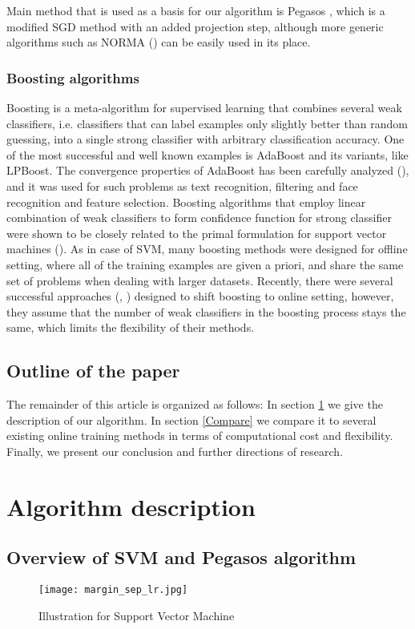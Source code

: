 \documentclass[10pt,twocolumn, a4paper]{article}
\begin{document}
Main method that is used as a basis for our algorithm is Pegasos \cite{Pegasos}, which is a modified SGD method with an added projection step, although more generic algorithms such as NORMA (\cite{Norma}) can be easily used in its place.

\subsubsection{Boosting algorithms}
Boosting is a meta-algorithm for supervised learning that combines several weak classifiers, i.e. classifiers that can label examples only slightly better than random guessing, into a single strong classifier with arbitrary classification accuracy. One of the most successful and well known examples is AdaBoost \cite{AdaBoost} and its variants, like LPBoost. The convergence properties of AdaBoost has been carefully analyzed (\cite{AdaAn}), and it was used for such problems as text recognition, filtering and face recognition and feature selection.  Boosting algorithms that employ linear combination of weak classifiers to form confidence function for strong classifier were shown to be closely related to the primal formulation for support vector machines (\cite{Boostsvm}). As in case of SVM, many boosting methods were designed for offline setting, where all of the training examples are given a priori, and share the same set of problems when dealing with larger datasets. Recently, there were several successful approaches (\cite{OZ}, \cite{OnlineBoost}) designed to shift boosting to online setting, however, they assume that the number of weak classifiers in the boosting process stays the same, which limits the flexibility of their methods.
 
\subsection{Outline of the paper}
The remainder of this article is organized as follows: In section \ref{Desc} we give the description of our algorithm. In section \ref{Compare} we compare it to several existing online training methods in terms of computational cost and flexibility. Finally, we present our conclusion and further directions of research.

\section{Algorithm description}
\label{Desc}
\subsection{Overview of SVM and Pegasos algorithm}
\label{svmdesc}
\begin{figure}
    \centering
    \texttt{[image: margin\_sep\_lr.jpg]}
    \caption{Illustration for Support Vector Machine}
    \label{Svm1}
\end{figure}
\end{document}
